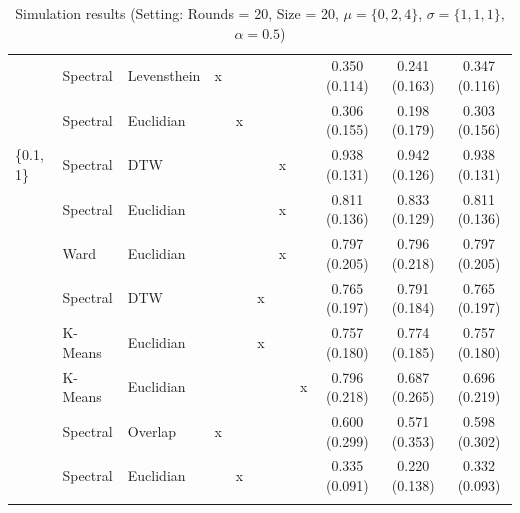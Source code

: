 \documentclass[12pt,a4paper,bibliography=totocnumbered,listof=totocnumbered]{scrartcl}
\begin{document}
\begin{appendix}
\begin{table}[!htbp]
\begin{tabularx}{\textwidth}{ lllcccccccc}
		& Spectral & Levensthein & x &  &  &  &  & 0.350 (0.114) & 0.241 (0.163) & 0.347 (0.116) \\ 
		& Spectral & Euclidian &  & x &  &  &  & 0.306 (0.155) & 0.198 (0.179) & 0.303 (0.156) \\ 
		\{0.1, 1\} & Spectral & DTW &  &  &  & x &  & 0.938 (0.131) & 0.942 (0.126) & 0.938 (0.131) \\ 
		& Spectral & Euclidian &  &  &  & x &  & 0.811 (0.136) & 0.833 (0.129) & 0.811 (0.136) \\ 
		& Ward  & Euclidian &  &  &  & x &  & 0.797 (0.205) & 0.796 (0.218) & 0.797 (0.205) \\ 
		& Spectral & DTW &  &  & x &  &  & 0.765 (0.197) & 0.791 (0.184) & 0.765 (0.197) \\ 
		& K-Means & Euclidian &  &  & x &  &  & 0.757 (0.180) & 0.774 (0.185) & 0.757 (0.180) \\ 
		& K-Means & Euclidian &  &  &  &  & x & 0.796 (0.218) & 0.687 (0.265) & 0.696 (0.219) \\ 
		& Spectral & Overlap & x &  &  &  &  & 0.600 (0.299) & 0.571 (0.353) & 0.598 (0.302) \\ 
		& Spectral & Euclidian &  & x &  &  &  & 0.335 (0.091) & 0.220 (0.138) & 0.332 (0.093) \\ 
		\hline \\[-1.8ex] 
		\end{tabularx} 
			\caption{Simulation results (Setting: Rounds = 20, Size = 20, $\mu = \{0,2,4\}$, $\sigma =  \{1,1,1\}$, $\alpha = 0.5$)} 
			
		\end{table}
	



\end{appendix}
\end{document}
